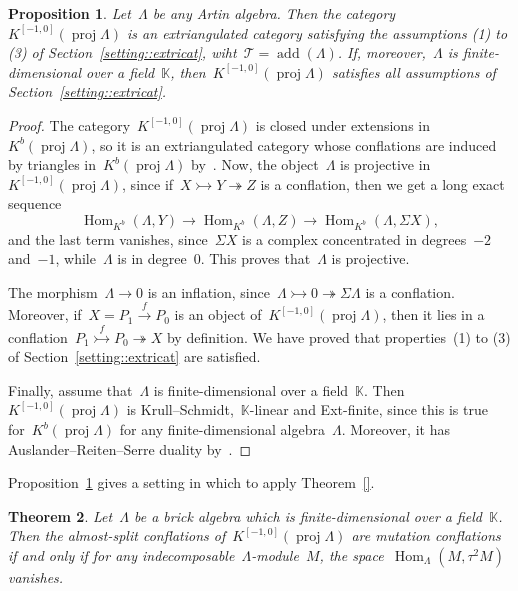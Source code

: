 \documentclass{amsart}
\newtheorem{theorem}{Theorem}[section]
\newtheorem{proposition}[theorem]{Proposition}
\theoremstyle{definition}
\newcommand{\pg}[1]{\todo[color=green!30]{#1 \\ \hfill --- PG.}}
\newcommand{\field}{\mathbb{K}}
\newcommand{\Hom}[1]{\operatorname{Hom}_{#1}}
\newcommand{\susp}{\Sigma}
\newcommand{\add}{\operatorname{add}}
\newcommand{\proj}{\operatorname{proj}}
\newcommand{\tc}{\mathcal{T}}
\newcommand{\infl}{\rightarrowtail}
\newcommand{\defl}{\twoheadrightarrow}
\begin{document}
\begin{proposition}
\label{prop::2kbproj-is-extriangulated}
 Let~$\Lambda$ be any Artin algebra.  Then the category~$K^{[-1,0]}(\proj \Lambda)$ is an extriangulated category satisfying the assumptions (1) to (3) of Section~\ref{setting::extricat}, wiht~$\tc = \add(\Lambda)$.  If, moreover,~$\Lambda$ is finite-dimensional over a field~$\field$, then~$K^{[-1,0]}(\proj \Lambda)$ satisfies all assumptions of Section~\ref{setting::extricat}. 
\end{proposition}
\begin{proof}
 The category~$K^{[-1,0]}(\proj \Lambda)$ is closed under extensions in~$K^b(\proj \Lambda)$, so it is an extriangulated category whose conflations are induced by triangles in~$K^b(\proj\Lambda)$ by~\cite[Remark 2.18]{NakaokaPalu}.  Now, the object~$\Lambda$ is projective in~$K^{[-1,0]}(\proj \Lambda)$, since if~$X\infl Y\defl Z$ is a conflation, then we get a long exact sequence
 \[
  \Hom{K^b}(\Lambda,Y)\to \Hom{K^b}(\Lambda,Z) \to  \Hom{K^b}(\Lambda, \susp X),
 \]
 and the last term vanishes, since~$\susp X$ is a complex concentrated in degrees~$-2$ and~$-1$, while~$\Lambda$ is in degree~$0$.  This proves that~$\Lambda$ is projective.
 
 The morphism~$\Lambda \to 0$ is an inflation, since~$\Lambda\infl 0 \defl \susp \Lambda$ is a conflation.  Moreover, if~$X= P_1\xrightarrow{f}P_0$ is an object of~$K^{[-1,0]}(\proj\Lambda)$, then it lies in a conflation~$P_1\stackrel{f}{\infl} P_0 \defl X$ by definition.  We have proved that properties~(1) to (3) of Section~\ref{setting::extricat} are satisfied.
 
 Finally, assume that~$\Lambda$ is finite-dimensional over a field~$\field$.  Then~$K^{[-1,0]}(\proj\Lambda)$ is Krull--Schmidt,~$\field$-linear and Ext-finite, since this is true for~$K^b(\proj\Lambda)$ for any finite-dimensional algebra~$\Lambda$.  Moreover, it has Auslander--Reiten--Serre duality by~\cite[Proposition 6.1]{IyamaNakaokaPalu}.
\end{proof}

Proposition~\ref{prop::2kbproj-is-extriangulated} gives a setting in which to apply Theorem~\ref{}.

\begin{theorem}
\label{theo::brick-algebra-condition}
 Let~$\Lambda$ be a brick algebra which is finite-dimensional over a field~$\field$\pg{True for any Artin algebra?}.  Then the almost-split conflations of~$K^{[-1,0]}(\proj \Lambda)$ are mutation conflations if and only if for any indecomposable~$\Lambda$-module~$M$, the space~$\Hom{\Lambda}(M, \tau^2 M)$ vanishes.
\end{theorem}
\end{document}
